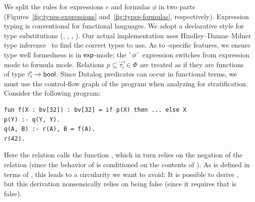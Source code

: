 \documentclass[acmsmall,screen,nonacm]{acmart}
\theoremstyle{definition}
\begin{document}
We split the rules for expressions $e$ and formulas $\phi$ in two
parts (Figures~\ref{fig:types-expressions}
and~\ref{fig:types-formulas}, respectively).
%
Expression typing is conventional for functional languages. 
%
We adopt a declarative style for type substitutions
(, , , ). Our actual
implementation uses Hindley--Damas--Milner type
inference~\citep{hindley,damas} to find the correct types to use.
%
As to \Name-specific features, we ensure type well formedness is in
$\mathsf{exp}$-mode; the $\textsf{\`{}}{\phi}\textsf{\`{}}$ expression switches from expression mode
to formula mode.
%
Relations $p \subseteq \vec{\tau_i} \in \Phi$ are treated as if they
are functions of type $\vec{\tau_i} \rightarrow \mathsf{bool}$. Since Datalog
predicates can occur in functional terms, we must use the control-flow
graph of the program when analyzing for stratification. Consider the
following program:
%
\begin{lstlisting}
fun f(X : bv[32]) : bv[32] = if p(X) then ... else X
p(Y) :- q(Y, Y).
q(A, B) :- r(A), B = f(A).
r(42).
\end{lstlisting}
%
Here the relation  calls the function , which in turn relies on the
negation of the relation  (since the behavior of  is conditioned on
the contents of ).
As  is defined in terms of , this
leads to a circularity we want to avoid: It is possible to derive , but this derivation nonsensically relies on  being false
(since it requires that  is false).
\end{document}
